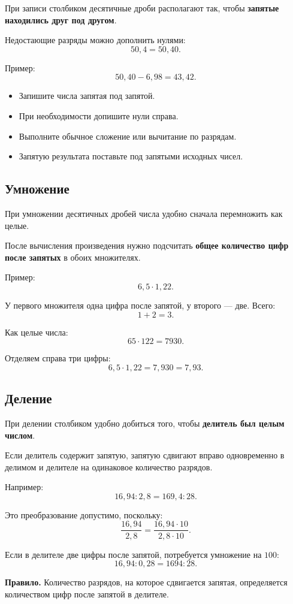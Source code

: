 \documentclass[a4paper,12pt]{article}
\newcommand{\checkitem}{\item[\textcolor{accent}{$\checkmark$}]}
\newcommand{\important}[1]{\textcolor{darkaccent}{\textbf{#1}}}
\begin{document}
При записи столбиком десятичные дроби располагают так, чтобы
\important{запятые находились друг под другом}.

Недостающие разряды можно дополнить нулями:
\[
50{,}4=50{,}40.
\]

Пример:
\[
50{,}40-6{,}98=43{,}42.
\]

\begin{itemize}
    \checkitem Запишите числа запятая под запятой.
    \checkitem При необходимости допишите нули справа.
    \checkitem Выполните обычное сложение или вычитание по разрядам.
    \checkitem Запятую результата поставьте под запятыми исходных чисел.
\end{itemize}

\subsection*{\color{accent}Умножение}

При умножении десятичных дробей числа удобно сначала перемножить как целые.

После вычисления произведения нужно подсчитать
\important{общее количество цифр после запятых} в обоих множителях.

Пример:
\[
6{,}5\cdot1{,}22.
\]

У первого множителя одна цифра после запятой, у второго --- две. Всего:
\[
1+2=3.
\]

Как целые числа:
\[
65\cdot122=7930.
\]

Отделяем справа три цифры:
\[
6{,}5\cdot1{,}22=7{,}930=7{,}93.
\]

\subsection*{\color{accent}Деление}

При делении столбиком удобно добиться того, чтобы
\important{делитель был целым числом}.

Если делитель содержит запятую, запятую сдвигают вправо одновременно
в делимом и делителе на одинаковое количество разрядов.

Например:
\[
16{,}94:2{,}8
=
169{,}4:28.
\]

Это преобразование допустимо, поскольку:
\[
\frac{16{,}94}{2{,}8}
=
\frac{16{,}94\cdot10}{2{,}8\cdot10}.
\]

Если в делителе две цифры после запятой, потребуется умножение на \(100\):
\[
16{,}94:0{,}28
=
1694:28.
\]

\important{Правило.}
Количество разрядов, на которое сдвигается запятая, определяется количеством
цифр после запятой в делителе.
\end{document}
